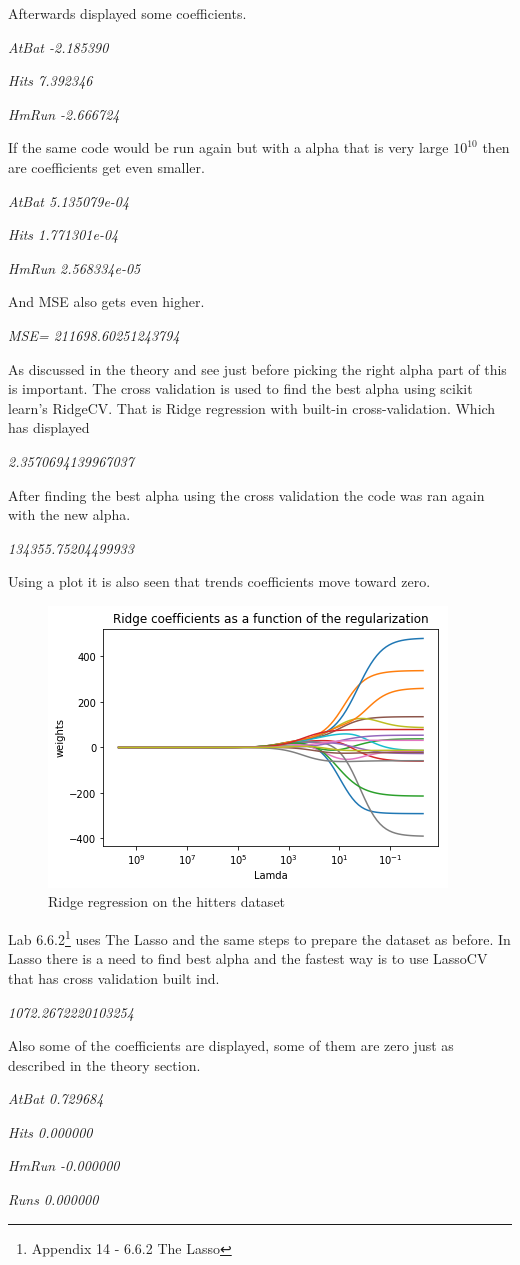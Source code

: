 Afterwards displayed some coefficients.

\noindent\textit{AtBat  -2.185390}

\noindent\textit{Hits    7.392346}

\noindent\textit{HmRun  -2.666724}

If the same code would be run again but with a alpha that is very large $10^10$ then are coefficients get even smaller.

\noindent\textit{AtBat  5.135079e-04}

\noindent\textit{Hits    1.771301e-04}

\noindent\textit{HmRun  2.568334e-05}

And  MSE also gets even higher.

\noindent\textit{MSE= 211698.60251243794}

As discussed in the theory and see just before picking the right alpha part of this is important. The cross validation is used to find the best alpha using scikit learn's RidgeCV. That is Ridge regression with built-in cross-validation. Which has displayed 

\noindent\textit{2.3570694139967037}

After finding the best alpha using the cross validation the code was ran again with the new alpha.   

\noindent\textit{134355.75204499933}

Using a plot it is also seen that trends coefficients move toward zero.
\begin{figure}[H]
	\centering
	\includegraphics[width=0.5\linewidth]{shrinkageMethods/fig/plot}
	\caption{Ridge regression on the hitters dataset}
	\label{fig:plot}
\end{figure}
Lab 6.6.2\footnote{Appendix 14 - 6.6.2 The Lasso} uses The Lasso and the same steps to prepare the dataset as before. In Lasso there is a need to find best alpha and the fastest way is to use LassoCV that has cross validation built ind.

\noindent\textit{1072.2672220103254}

Also some of the coefficients are displayed, some of them are zero just as described in the theory section.

\noindent\textit{AtBat          0.729684}

\noindent\textit{Hits           0.000000}

\noindent\textit{HmRun         -0.000000}

\noindent\textit{Runs           0.000000}